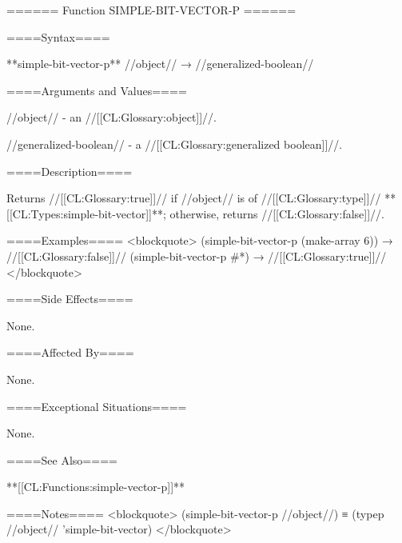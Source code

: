 ====== Function SIMPLE-BIT-VECTOR-P ======

====Syntax====

**simple-bit-vector-p** //object// → //generalized-boolean//

====Arguments and Values====

//object// - an //[[CL:Glossary:object]]//.

//generalized-boolean// - a //[[CL:Glossary:generalized boolean]]//.

====Description====

Returns //[[CL:Glossary:true]]// if //object// is of //[[CL:Glossary:type]]// **[[CL:Types:simple-bit-vector]]**; otherwise, returns //[[CL:Glossary:false]]//.

====Examples==== <blockquote> (simple-bit-vector-p (make-array 6)) → //[[CL:Glossary:false]]// (simple-bit-vector-p #*) → //[[CL:Glossary:true]]// </blockquote>

====Side Effects====

None.

====Affected By====

None.

====Exceptional Situations====

None.

====See Also====

**[[CL:Functions:simple-vector-p]]**

====Notes==== <blockquote> (simple-bit-vector-p //object//) ≡ (typep //object// 'simple-bit-vector) </blockquote>

